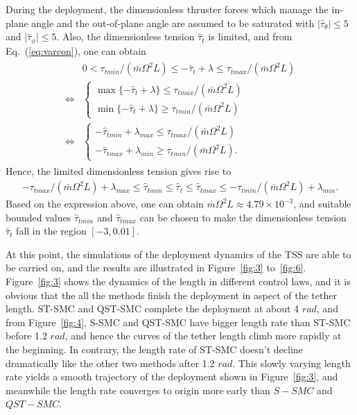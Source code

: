 \documentclass[Journal,letterpaper]{ascelike-new}
\theoremstyle{plain}
\theoremstyle{remark}
\begin{document}
During the deployment, the dimensionless thruster forces which manage the in-plane angle and the out-of-plane angle are assumed to be saturated with $\vert\hat\tau_{\theta}\vert\le5 $ and $\vert\hat\tau_{\phi}\vert\le 5$. Also, the dimensionless tension $\hat\tau_t$ is limited, and from Eq.~(\ref{eq:varcon}), one can obtain
\begin{align}
\begin{split}
&0<\tau_{tmin}/(\bar{m}\Omega^2L)\le-\hat\tau_t+\lambda\le\tau_{tmax}/(\bar{m}\Omega^2L)\\
\Leftrightarrow
&\begin{cases}
\max\{-\hat\tau_t+\lambda\}\le\tau_{tmax}/(\bar{m}\Omega^2L)\\
\min\{-\hat\tau_t+\lambda\}\ge\tau_{tmin}/(\bar{m}\Omega^2L)
\end{cases}\\
\Leftrightarrow
&\begin{cases}
-\hat\tau_{tmin}+\lambda_{max}\le\tau_{tmax}/(\bar{m}\Omega^2L)\\
-\hat\tau_{tmax}+\lambda_{min}\ge\tau_{tmin}/(\bar{m}\Omega^2L).
\end{cases}
\end{split}
\end{align}
Hence, the limited dimensionless tension gives rise to
\begin{align}
-\tau_{tmax}/(\bar{m}\Omega^2L)+\lambda_{max}\le\hat\tau_{tmin}\le\hat\tau_t\le\hat\tau_{tmax}\le-\tau_{tmin}/(\bar{m}\Omega^2L)+\lambda_{min}.
\end{align}
Based on the expression above, one can obtain $\bar{m}\Omega^2L\approx 4.79\times 10^{-3}$, and suitable bounded values $\hat\tau_{tmin}$ and $\hat\tau_{tmax}$ can be chosen to make the dimensionless tension $\hat\tau_t$ fall in the region $[-3,0.01]$.\par
At this point, the simulations of the deployment dynamics of the TSS are able to be carried on, and the results are illustrated in Figure~\ref{fig:3} to~\ref{fig:6}. Figure~\ref{fig:3} shows the dynamics of the length in different control laws, and it is obvious that the all the methods finish the deployment in aspect of the tether length. ST-SMC and QST-SMC complete the deployment at about 4 $rad$, and from Figure~\ref{fig:4}, S-SMC and QST-SMC have bigger length rate than ST-SMC before 1.2 $rad$, and hence the curves of the tether length climb more rapidly at the beginning. In contrary, the length rate of ST-SMC doesn't decline dramatically like the other two methods after 1.2 $rad$. This slowly varying length rate yields a smooth trajectory of the deployment shown in Figure~\ref{fig:3}, and meanwhile the length rate converges to origin more early than $S-SMC$ and $QST-SMC$.\par
\end{document}
